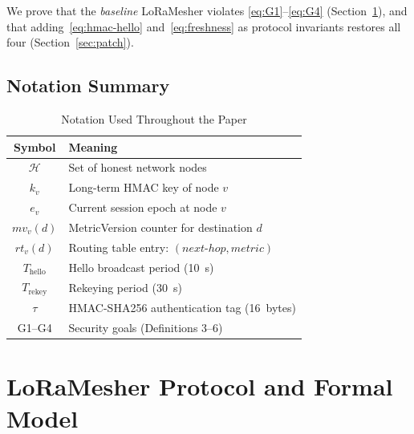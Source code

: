 \documentclass[10pt,journal,compsoc]{IEEEtran}
\begin{document}
We prove that the \emph{baseline} LoRaMesher violates
\eqref{eq:G1}--\eqref{eq:G4} (Section~\ref{sec:formal}),
and that adding~\eqref{eq:hmac-hello} and~\eqref{eq:freshness}
as protocol invariants restores all four (Section~\ref{sec:patch}).

\subsection{Notation Summary}

\begin{table}[h]
  \centering
  \caption{Notation Used Throughout the Paper}
  \label{tab:notation}
  \setlength{\tabcolsep}{4pt}
  \begin{tabular}{cl}
    \toprule
    \textbf{Symbol} & \textbf{Meaning} \\
    \midrule
    $\mathcal{H}$   & Set of honest network nodes \\
    $k_v$           & Long-term HMAC key of node $v$ \\
    $e_v$           & Current session epoch at node $v$ \\
    $mv_v(d)$       & MetricVersion counter for destination $d$ \\
    $rt_v(d)$       & Routing table entry: $(next\text{-}hop, metric)$ \\
    $T_{\text{hello}}$ & Hello broadcast period (10~s) \\
    $T_{\text{rekey}}$ & Rekeying period (30~s) \\
    $\tau$          & HMAC-SHA256 authentication tag (16~bytes) \\
    G1--G4          & Security goals (Definitions 3--6) \\
    \bottomrule
  \end{tabular}
\end{table}

\section{LoRaMesher Protocol and Formal Model}
\label{sec:formal}
\end{document}
